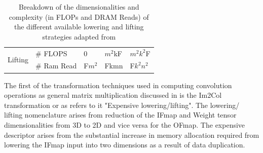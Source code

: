 \begin{table}[!ht]
\begin{tabular}{ll|l|l|l|}
    \multicolumn{1}{|l|}{\multirow{2}{*}{Lifting}}                                                    & \# FLOPS            & 0                                                                        & $m^2$kF                                                      & $m^2$$k^2$F                              \\ \cline{2-5} 
    \multicolumn{1}{|l|}{}                                                                            & \# Ram Read         & F$m^2$                                                                   & Fkmn                                                                        & F$k^2$$n^2$                              \\ \hline
    \end{tabular}
\label{Table:lowering_lifting_breakdown}
    \caption{Breakdown of the dimensionalities and complexity (in FLOPs and DRAM Reads) of the different available lowering and lifting strategies adapted from \cite{cafe_con_troll}}
\end{table}

The first of the transformation techniques used in computing convolution
operations as general matrix multiplication discussed in \cite{cafe_con_troll}
is the Im2Col transformation or as \cite{cafe_con_troll} refers to it
"Expensive lowering/lifting". The lowering/ lifting nomenclature arises from
reduction of the IFmap and Weight tensor dimensionalities from 3D to 2D and vice
versa for the OFmap. The expensive descriptor arises from the substantial
increase in memory allocation required from lowering the IFmap input into two
dimensions as a result of data duplication. 

